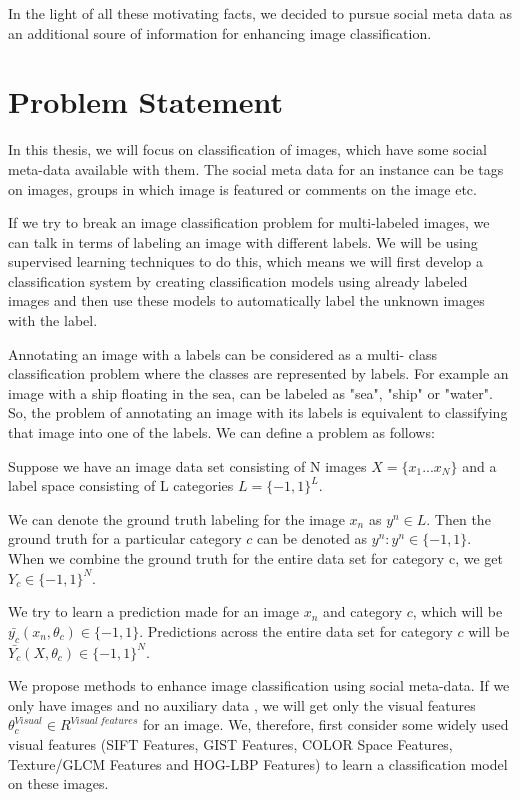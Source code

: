  In the light of all these motivating facts, we decided to pursue 
social meta data as an additional soure of information for 
enhancing image classification.

\section{Problem Statement}
In this thesis, we will focus on classification of images, which 
have some social meta-data available with them. The social meta data 
for an instance can be  tags on images, groups in which image is 
featured or comments on the image etc. 

If we try to break an image classification problem for multi-labeled 
images, we can talk in terms of labeling an image with different 
labels. We will be using supervised learning techniques to do this, 
which means we will first develop a classification system by 
creating classification models using already labeled images and then 
use these models to automatically label the unknown images with the 
label.

Annotating an image  with a labels can be considered as a multi-
class classification problem where the classes are represented by 
labels. For example an image with a ship floating in the sea, can be labeled 
as "sea", "ship" or "water". So, the problem of annotating an image 
with its labels is equivalent to classifying that image into one of 
the labels. We can define a problem as follows:

	Suppose we have an image data set consisting of N images $X = \{x_1 ...x_N\}$ and a label space consisting of L categories $L = \{-1, 1\}^L$. 
	
	We can denote the ground truth labeling for the image $x_n$ as $y^n\in L$. Then the ground truth for a particular category $c$ can be denoted as $y^n:y^n \in \{-1,1\}$. When we combine the ground truth for the entire data set for category c, we get $Y_c \in \{-1,1\}^N$. 
	
We try to learn a prediction made for an image $x_n$ and category $c$, 
which will be $\bar{y_c} (x_n,\theta_c)\in\{-1,1\} $. Predictions 
across the entire data set for category $c$ will be 
$\bar{Y_c}(X,\theta_c) \in \{-1,1\}^N$. 
	 
	 We propose methods to enhance image classification using 
social meta-data. If we only have images and no auxiliary data , 
we will get only the visual features  $\theta_c ^ {Visual} \in R^{Visual\ features}$ for an image. We, therefore, first consider some widely used visual features (SIFT Features, GIST Features,  COLOR Space Features, Texture/GLCM Features and HOG-LBP Features) to learn a classification model on these images.
	 
